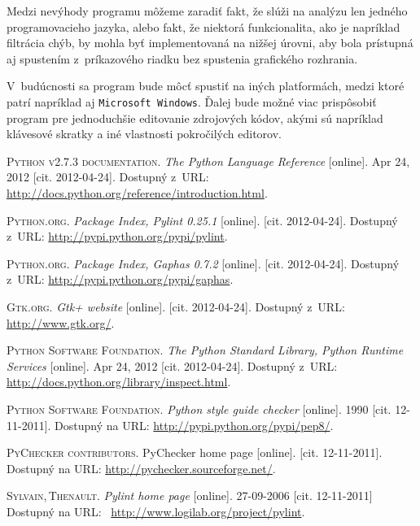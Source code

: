 \documentclass[11pt,oneside,final]{fithesis2}
\begin{document}
	Medzi nevýhody programu môžeme zaradiť fakt, že slúži na analýzu len jedného programovacieho jazyka, alebo fakt, že niektorá funkcionalita, ako je napríklad filtrácia chýb, by mohla byť implementovaná na nižšej úrovni, aby bola prístupná aj spustením z~príkazového riadku bez spustenia grafického rozhrania.
	
	V~budúcnosti sa program bude môcť spustiť na iných platformách, medzi ktoré patrí napríklad aj \texttt{Microsoft Windows}. Ďalej bude možné viac prispôsobiť program pre jednoduchšie editovanie zdrojových kódov, akými sú napríklad klávesové skratky a iné vlastnosti pokročilých editorov.
	
	
	
\begin{thebibliography}{99}

		\textsc{Python v2.7.3 documentation}.
		\textit{The Python Language Reference} [online].
		Apr 24, 2012 [cit. \mbox{2012-04-24}].
		Dostupný z~URL:
		\url{http://docs.python.org/reference/introduction.html}.
		
		
		\textsc{Python.org}.
		\textit{Package Index, Pylint 0.25.1} [online].
		[cit. \mbox{2012-04-24}].
		Dostupný z~URL:
		\url{http://pypi.python.org/pypi/pylint}.

		\textsc{Python.org}.
		\textit{Package Index, Gaphas 0.7.2} [online].
		[cit. \mbox{2012-04-24}].
		Dostupný z~URL:
		\url{http://pypi.python.org/pypi/gaphas}.

		\textsc{Gtk.org}.
		\textit{Gtk+ website} [online].
		[cit. \mbox{2012-04-24}].
		Dostupný z~URL:
		\url{http://www.gtk.org/}.
		
		\textsc{Python Software Foundation}.
		\textit{The Python Standard Library, Python Runtime Services} [online].
		Apr 24, 2012 [cit. \mbox{2012-04-24}].
		Dostupný z~URL:
		\url{http://docs.python.org/library/inspect.html}.
		
    \textsc{Python Software Foundation}.
    \textit{Python style guide checker} [online]. 1990 [cit. 12-11-2011].
    Dostupný na URL:
    \url{http://pypi.python.org/pypi/pep8/}.
    
    \textsc{PyChecker contributors}.
    {PyChecker home page} [online].
    [cit. 12-11-2011].
    Dostupný na URL:
    \url{http://pychecker.sourceforge.net/}.
    
    \textsc{Sylvain,\,Thenault}.
    \textit{Pylint home page} [online].
    27-09-2006
    [cit. 12-11-2011]
    Dostupný na URL:~
    \url{http://www.logilab.org/project/pylint}.
    

\end{thebibliography}
\end{document}

